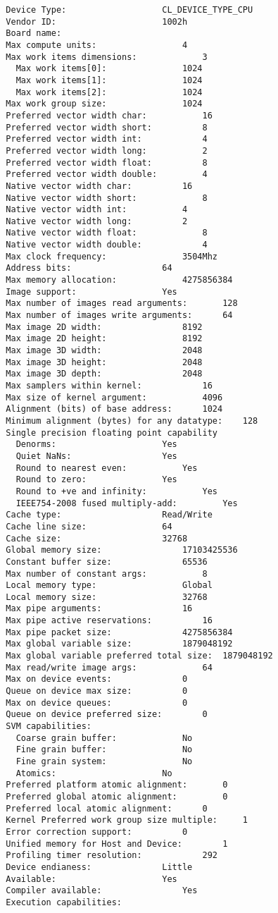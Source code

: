 \documentclass[12pt]{article}
\begin{document}
\begin{lstlisting}
  Device Type:					 CL_DEVICE_TYPE_CPU
  Vendor ID:					 1002h
  Board name:					 
  Max compute units:				 4
  Max work items dimensions:			 3
    Max work items[0]:				 1024
    Max work items[1]:				 1024
    Max work items[2]:				 1024
  Max work group size:				 1024
  Preferred vector width char:			 16
  Preferred vector width short:			 8
  Preferred vector width int:			 4
  Preferred vector width long:			 2
  Preferred vector width float:			 8
  Preferred vector width double:		 4
  Native vector width char:			 16
  Native vector width short:			 8
  Native vector width int:			 4
  Native vector width long:			 2
  Native vector width float:			 8
  Native vector width double:			 4
  Max clock frequency:				 3504Mhz
  Address bits:					 64
  Max memory allocation:			 4275856384
  Image support:				 Yes
  Max number of images read arguments:		 128
  Max number of images write arguments:		 64
  Max image 2D width:				 8192
  Max image 2D height:				 8192
  Max image 3D width:				 2048
  Max image 3D height:				 2048
  Max image 3D depth:				 2048
  Max samplers within kernel:			 16
  Max size of kernel argument:			 4096
  Alignment (bits) of base address:		 1024
  Minimum alignment (bytes) for any datatype:	 128
  Single precision floating point capability
    Denorms:					 Yes
    Quiet NaNs:					 Yes
    Round to nearest even:			 Yes
    Round to zero:				 Yes
    Round to +ve and infinity:			 Yes
    IEEE754-2008 fused multiply-add:		 Yes
  Cache type:					 Read/Write
  Cache line size:				 64
  Cache size:					 32768
  Global memory size:				 17103425536
  Constant buffer size:				 65536
  Max number of constant args:			 8
  Local memory type:				 Global
  Local memory size:				 32768
  Max pipe arguments:				 16
  Max pipe active reservations:			 16
  Max pipe packet size:				 4275856384
  Max global variable size:			 1879048192
  Max global variable preferred total size:	 1879048192
  Max read/write image args:			 64
  Max on device events:				 0
  Queue on device max size:			 0
  Max on device queues:				 0
  Queue on device preferred size:		 0
  SVM capabilities:				 
    Coarse grain buffer:			 No
    Fine grain buffer:				 No
    Fine grain system:				 No
    Atomics:					 No
  Preferred platform atomic alignment:		 0
  Preferred global atomic alignment:		 0
  Preferred local atomic alignment:		 0
  Kernel Preferred work group size multiple:	 1
  Error correction support:			 0
  Unified memory for Host and Device:		 1
  Profiling timer resolution:			 292
  Device endianess:				 Little
  Available:					 Yes
  Compiler available:				 Yes
  Execution capabilities:				 

\end{lstlisting}
\end{document}
